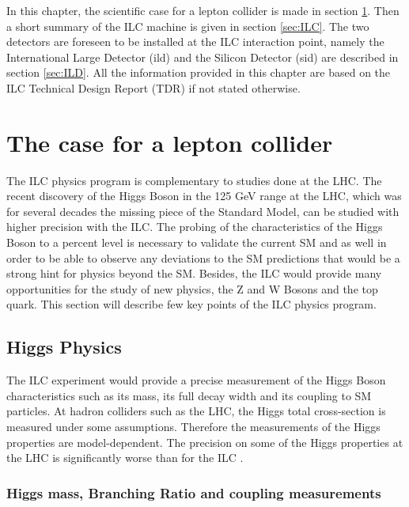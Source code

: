 In this chapter, the scientific case for a lepton collider is made in section \ref{sec:ILC_Physics}. Then a short summary of the ILC machine is given in section \ref{sec:ILC}. The two detectors are foreseen to be installed at the ILC interaction point, namely the International Large Detector (\acrshort{ild}) and the Silicon Detector (\acrshort{sid}) are described in section \ref{sec:ILD}. All the information provided in this chapter are based on the ILC Technical Design Report (TDR) \cite{ILC_TDR_Vol1, ILC_TDR_Vol2, ILC_TDR_Vol3.1, ILC_TDR_Vol3.2, ILC_TDR_Vol4} if not stated otherwise.

\section{The case for a lepton collider}
\label{sec:ILC_Physics}

The ILC physics program is complementary to studies done at the LHC. The recent discovery of the Higgs Boson in the 125 GeV range at the LHC, which was for several decades the missing piece of the Standard Model, can be studied with higher precision with the ILC. The probing of the characteristics of the Higgs Boson to a percent level is necessary to validate the current SM and as well in order to be able to observe any deviations to the SM predictions that would be a strong hint for physics beyond the SM. Besides, the ILC would provide many opportunities for the study of new physics, the Z and W Bosons and the top quark. This section will describe few key points of the ILC physics program.

\subsection{Higgs Physics}

The ILC experiment would provide a precise measurement of the Higgs Boson characteristics such as its mass, its full decay width and its coupling to SM particles. At hadron colliders such as the LHC, the Higgs total cross-section is measured under some assumptions. Therefore the measurements of the Higgs properties are model-dependent. The precision on some of the Higgs properties at the LHC is significantly worse than for the ILC \cite{Fujii:2015jha}.

\subsubsection{Higgs mass, Branching Ratio and coupling measurements}

